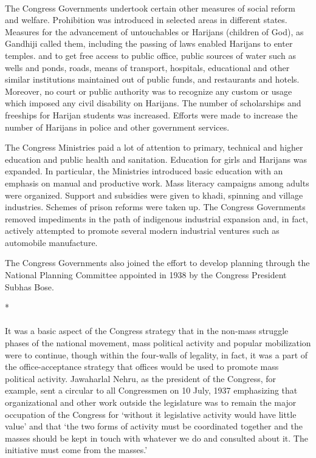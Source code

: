 \begin{multicols}{2}
\paragraph*{}
The Congress Governments undertook certain other measures of social reform and welfare. Prohibition was introduced in selected areas in different states. Measures for the advancement of untouchables or Harijans (children of God), as Gandhiji called them, including the passing of laws enabled Harijans to enter temples. and to get free access to public office, public sources of water such as wells and ponds, roads, means of transport, hospitals, educational and other similar institutions maintained out of public funds, and restaurants and hotels. Moreover, no court or public authority was to recognize any custom or usage which imposed any civil disability on Harijans. The number of scholarships and freeships for Harijan students was increased. Efforts were made to increase the number of Harijans in police and other government services.

The Congress Ministries paid a lot of attention to primary, technical and higher education and public health and sanitation. Education for girls and Harijans was expanded. In particular, the Ministries introduced basic education with an emphasis on manual and productive work. Mass literacy campaigns among adults were organized. Support and subsidies were given to khadi, spinning and village industries. Schemes of prison reforms were taken up. The Congress Governments removed impediments in the path of indigenous industrial expansion and, in fact, actively attempted to promote several modern industrial ventures such as automobile manufacture.

The Congress Governments also joined the effort to develop planning through the National Planning Committee appointed in 1938 by the Congress President Subhas Bose.

\begin{center}*\end{center}

\paragraph*{}
It was a basic aspect of the Congress strategy that in the non-mass struggle phases of the national movement, mass political activity and popular mobilization were to continue, though within the four-walls of legality, in fact, it was a part of the office-acceptance strategy that offices would be used to promote mass political activity. Jawaharlal Nehru, as the president of the Congress, for example, sent a circular to all Congressmen on 10 July, 1937 emphasizing that organizational and other work outside the legislature was to remain the major occupation of the Congress for `without it legislative activity would have little value' and that `the two forms of activity must be coordinated together and the masses should be kept in touch with whatever we do and consulted about it. The initiative must come from the masses.'


\end{multicols}
